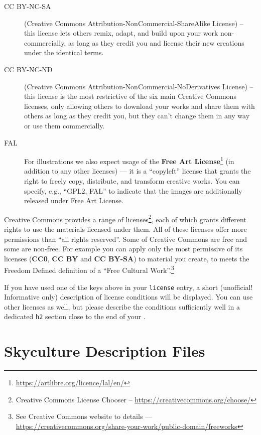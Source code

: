 \begin{description}
  \item[CC BY-NC-SA] (Creative Commons Attribution-NonCommercial-ShareAlike License) -- this license lets others remix, adapt, and build upon your work non-commercially, as long as they credit you and license their new creations under the identical terms.
  \item[CC BY-NC-ND] (Creative Commons Attribution-NonCommercial-NoDerivatives License) -- this license is the most restrictive of the six main Creative Commons licenses, only allowing others to download your works and share them with others as long as they credit you, but they can’t change them in any way or use them commercially.
  \item[FAL] For illustrations we also expect usage of the \textbf{Free Art License}\footnote{\url{https://artlibre.org/licence/lal/en/}} (in addition to any other licenses) ---
    it is a ``copyleft'' license that grants the right to freely copy, distribute, and transform creative works. You can specify, e.g., ``GPL2, FAL'' to indicate that the images are additionally released under Free Art License.
\end{description}

Creative Commons provides a range of licenses\footnote{Creative
  Commons License Chooser --
  \url{https://creativecommons.org/choose/}}, each of which grants
different rights to use the materials licensed under them. All of
these licenses offer more permissions than ``all rights
reserved''. Some of Creative Commons are free and some are
non-free. For example you can apply only the most permissive of its
licenses (\textbf{CC0}, \textbf{CC BY} and \textbf{CC BY-SA}) to
material you create, to meets the Freedom Defined definition of a
``Free Cultural Work''.\footnote{See Creative Commons website to
  details ---
  \url{https://creativecommons.org/share-your-work/public-domain/freeworks}}

If you have used one of the keys above in your \texttt{license} entry,
a short (unofficial!  Informative only) description of license
conditions will be displayed. You can use other licenses as well, but
please describe the conditions sufficiently well in a dedicated
\texttt{h2} section close to the end of your
.

\section{Skyculture Description Files}
\label{sec:skycultures:description}


